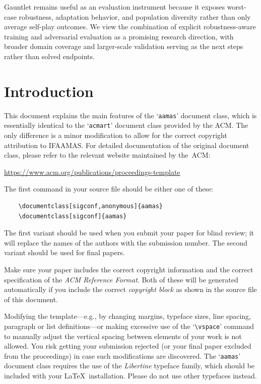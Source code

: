 \documentclass[sigconf,anonymous]{aamas}
\begin{document}
Gauntlet remains useful as an evaluation instrument because it exposes worst-case robustness, adaptation behavior, and population diversity rather than only average self-play outcomes. We view the combination of explicit robustness-aware training and adversarial evaluation as a promising research direction, with broader domain coverage and larger-scale validation serving as the next steps rather than solved endpoints.








\balance


\iffalse


\section{Introduction}

This document explains the main features of the `\texttt{aamas}' 
document class, which is essentially identical to the `\texttt{acmart}'
document class provided by the ACM. The only difference is a minor 
modification to allow for the correct copyright attribution to IFAAMAS.
For detailed documentation of the original document class, please refer 
to the relevant website maintained by the~ACM:
%
\begin{center}
\url{https://www.acm.org/publications/proceedings-template}
\end{center}
%
The first command in your source file should be either one of these:
\begin{verbatim}
    \documentclass[sigconf,anonymous]{aamas}
    \documentclass[sigconf]{aamas}
\end{verbatim}
%
The first variant should be
used when you submit your paper for blind review; it will replace the names of the authors with the submission number.
The second variant should be used for final papers. 

Make sure your paper includes the correct copyright information and 
the correct specification of the \emph{ACM Reference Format}. Both of 
these will be generated automatically if you include the correct 
\emph{copyright block} as shown in the source file of this document.

Modifying the template---e.g., by changing margins, typeface sizes, 
line spacing, paragraph or list definitions---or making excessive use 
of the `\verb|\vspace|' command to manually adjust the vertical spacing 
between elements of your work is not allowed. You risk getting your 
submission rejected (or your final paper excluded from the proceedings) 
in case such modifications are discovered. The `\texttt{aamas}' document 
class requires the use of the \textit{Libertine} typeface family, which 
should be included with your \LaTeX\ installation. Please do not use 
other typefaces instead.
\end{document}
